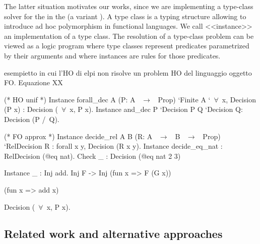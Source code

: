 \documentclass{rapport}
\begin{document}
The latter situation motivates our works, since we are implementing a type-class
solver for the \ol \coq in the \ml \elpi (a variant \lambdaprolog). A type class
\cite{wadler89, sozeau08} is a typing structure allowing to introduce ad hoc
polymorphism in functional languages. We call <<instance>> an implementation of
a type class. The resolution of a type-class problem can be viewed as a logic
program where type classes represent predicates parametrized by their arguments
and where instances are rules for those predicates. 





esempietto in cui l'HO di elpi non risolve un problem HO del linguaggio
oggetto FO. Equazione XX


\begin{coqcode}
(* HO unif *)
Instance forall_dec A (P: A ~$\to$~ Prop) `{Finite A} `{~$\forall$~x, Decision (P x)} :
  Decision (~$\forall$~x, P x).
Instance and_dec P `{Decision P} Q `{Decision Q}:  Decision (P /\ Q).



(* FO approx *)
Instance decide_rel A B (R: A ~$\to$~ B ~$\to$~ Prop) `{RelDecision R} :
  forall x y, Decision (R x y).
Instance decide_eq_nat : RelDecision (@eq nat).
Check _ : Decision (@eq nat 2 3)


Instance _ : Inj add.
             Inj F -> Inj (fun x => F (G x))

             (fun x => add x)


  Decision (~$\forall$~x, P x).

\end{coqcode}

\subsection{Related work and alternative approaches}
\end{document}
